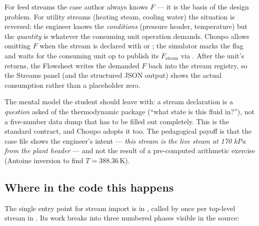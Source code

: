 \documentclass[11pt,a4paper]{article}
\begin{document}
For feed streams the case author always knows $F$ --- it is the
basis of the design problem.  For utility streams (heating
steam, cooling water) the situation is reversed: the engineer
knows the \emph{conditions} (pressure header, temperature) but
the \emph{quantity} is whatever the consuming unit operation
demands.  Choupo allows omitting $F$ when the stream is
declared with  or
; the simulator marks the
 flag and waits for the
consuming unit op to publish its $F_{\mathrm{steam}}$ via
.  After the unit's  returns,
the Flowsheet writes the demanded $F$ back into the stream
registry, so the Streams panel (and the structured JSON output)
shows the actual consumption rather than a placeholder zero.

\begin{intuition}
The mental model the student should leave with: a stream
declaration is a \emph{question} asked of the thermodynamic
package (``what state is this fluid in?''), not a five-number
data dump that has to be filled out completely.  This is the
standard contract, and Choupo adopts it too.  The pedagogical payoff is that the case file shows
the engineer's intent --- \emph{this stream is the live steam at
170 kPa from the plant header} --- and not the result of a
pre-computed arithmetic exercise (Antoine inversion to find
$T = 388.36$\,K).
\end{intuition}

\subsection{Where in the code this happens}

The single entry point for stream import is
 in
, called by
 once per top-level stream
in .  Its work breaks into
three numbered phases visible in the source:
\end{document}

